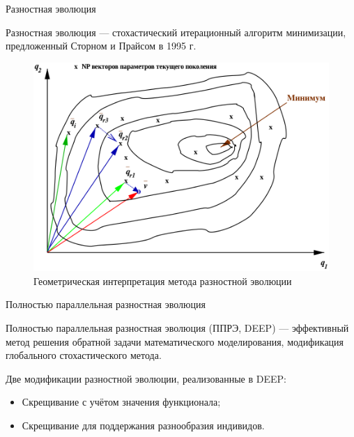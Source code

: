 \documentclass{beamer}
\begin{document}
\begin{frame}{Разностная эволюция}
    \begin{block}{Разностная эволюция}
        --- стохастический итерационный алгоритм минимизации,
        предложенный Сторном и Прайсом в 1995 г.
    \end{block}
    \begin{figure}[!h]
        \centering
        \includegraphics[scale=0.2]{DE}
        \caption{Геометрическая интерпретация метода разностной эволюции}
    \end{figure}
\end{frame}

\begin{frame}{Полностью параллельная разностная эволюция}
    \begin{block}{Полностью параллельная разностная эволюция (ППРЭ, DEEP)}
        --- эффективный метод решения
        обратной задачи математического моделирования,
        модификация глобального стохастического метода.
    \end{block}
    \bigskip

    Две модификации разностной эволюции,
    реализованные в DEEP:
    \bigskip

    \begin{itemize}
        \itemsep 1em
        \item Скрещивание с учётом значения функционала;
        \item Скрещивание для поддержания разнообразия индивидов.
    \end{itemize}
\end{frame}
\end{document}
